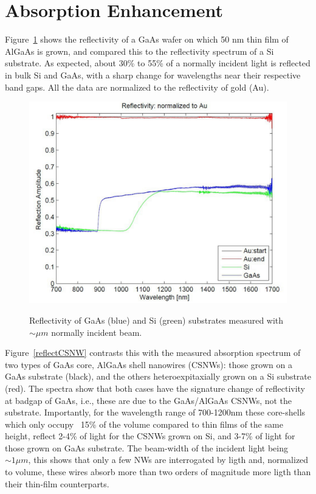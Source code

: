 \section{Absorption Enhancement} \label{Data_Abs}

Figure~\ref{reflecbulk} shows the reflectivity of a GaAs wafer on which 50 nm
thin film of AlGaAs is grown, and compared this to the reflectivity spectrum of
a Si substrate. As expected, about 30\% to 55\% of a normally incident light is
reflected in bulk Si and GaAs, with a sharp change for wavelengths near their
respective band gaps. All the data are normalized to the reflectivity of gold
(Au).

\begin{figure}
  \caption{Reflectivity of GaAs (blue) and Si (green) substrates measured with $\sim{\mu}m$ normally incident beam.}
  \centering
  \includegraphics[width=\textwidth]{pictures/Data/reflecbulk}
  \label{reflecbulk}
\end{figure}

Figure~\ref{reflectCSNW} contrasts this with the measured absorption spectrum
of two types of GaAs core, AlGaAs shell nanowires (CSNWs): those grown on a
GaAs substrate (black), and the others heteroexpitaxially grown on a Si
substrate (red). The spectra show that both cases have the signature change of
reflectivity at badgap of GaAs, i.e., these are due to the GaAs/AlGaAs CSNWs,
not the substrate. Importantly, for the wavelength range of 700-1200nm these
core-shells which only occupy ~15\% of the volume compared to thin films of the
same height, reflect 2-4\% of light for the CSNWs grown on Si, and 3-7\% of
light for those grown on GaAs substrate. The beam-width of the incident light
being $\sim1{\mu}m$, this shows that only a few NWs are interrogated by ligth
and, normalized to volume, these wires absorb more than two orders of magnitude
more ligth than their thin-film counterparts.

